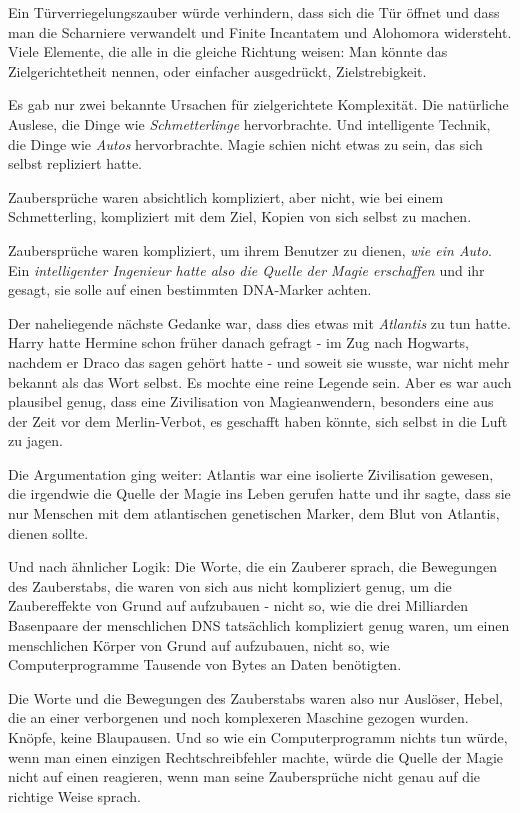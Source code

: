 Ein Türverriegelungszauber würde verhindern, dass sich die Tür öffnet und dass
man die Scharniere verwandelt und Finite Incantatem und Alohomora widersteht.
Viele Elemente, die alle in die gleiche Richtung weisen: Man könnte das
Zielgerichtetheit nennen, oder einfacher ausgedrückt, Zielstrebigkeit.

Es gab nur zwei bekannte Ursachen für zielgerichtete Komplexität. Die natürliche
Auslese, die Dinge wie \emph{Schmetterlinge} hervorbrachte. Und intelligente
Technik, die Dinge wie \emph{Autos} hervorbrachte. Magie schien nicht etwas zu
sein, das sich selbst repliziert hatte.

Zaubersprüche waren absichtlich kompliziert, aber nicht, wie bei einem
Schmetterling, kompliziert mit dem Ziel, Kopien von sich selbst zu machen.

Zaubersprüche waren kompliziert, um ihrem Benutzer zu dienen, \emph{wie ein
Auto}. Ein \emph{intelligenter Ingenieur hatte also die Quelle der Magie
erschaffen} und ihr gesagt, sie solle auf einen bestimmten DNA-Marker achten.

Der naheliegende nächste Gedanke war, dass dies etwas mit \emph{\glqq
Atlantis\grqq{}} zu tun hatte. Harry hatte Hermine schon früher danach gefragt
- im Zug nach Hogwarts, nachdem er Draco das sagen gehört hatte - und soweit sie
wusste, war nicht mehr bekannt als das Wort selbst. Es mochte eine reine Legende
sein. Aber es war auch plausibel genug, dass eine Zivilisation von
Magieanwendern, besonders eine aus der Zeit vor dem Merlin-Verbot, es
geschafft haben könnte, sich selbst in die Luft zu jagen.

Die Argumentation ging weiter: Atlantis war eine isolierte Zivilisation gewesen,
die irgendwie die Quelle der Magie ins Leben gerufen hatte und ihr sagte, dass
sie nur Menschen mit dem atlantischen genetischen Marker, dem Blut von Atlantis,
dienen sollte.

Und nach ähnlicher Logik: Die Worte, die ein Zauberer sprach, die Bewegungen des
Zauberstabs, die waren von sich aus nicht kompliziert genug, um die
Zaubereffekte von Grund auf aufzubauen - nicht so, wie die drei Milliarden
Basenpaare der menschlichen DNS tatsächlich kompliziert genug waren, um einen
menschlichen Körper von Grund auf aufzubauen, nicht so, wie Computerprogramme
Tausende von Bytes an Daten benötigten.

Die Worte und die Bewegungen des Zauberstabs waren also nur Auslöser, Hebel, die
an einer verborgenen und noch komplexeren Maschine gezogen wurden. Knöpfe, keine
Blaupausen. Und so wie ein Computerprogramm nichts tun würde, wenn man einen
einzigen Rechtschreibfehler machte, würde die Quelle der Magie nicht auf einen
reagieren, wenn man seine Zaubersprüche nicht genau auf die richtige Weise
sprach.

